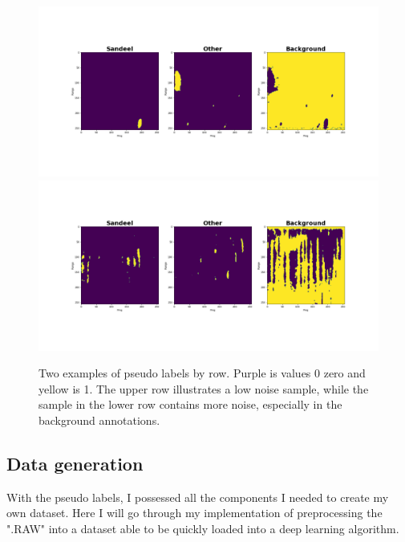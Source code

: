         \clearpage
        \begin{figure}[H]
            \centering
            \includegraphics[scale=0.32]{figures/data_sample.png}
          	\includegraphics[scale=0.32]{figures/data_sample_noisy.png}
            \caption[Example pseudo label]{Two examples of pseudo labels by row. Purple is values 0 zero and yellow is 1. The upper row illustrates a low noise sample, while the sample in the lower row contains more noise, especially in the background annotations.}
            \label{data sample fig}
        \end{figure}        
        
        
    \subsection{Data generation}
        With the pseudo labels, I possessed all the components I needed to create my own dataset. Here I will go through my implementation of preprocessing the ".RAW" into a dataset able to be quickly loaded into a deep learning algorithm.
        
